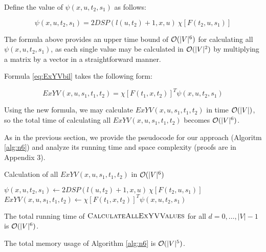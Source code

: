 Define the value of $\psi(x, u, t_2, s_1)$ as follows:

\begin{equation}
\psi(x, u, t_2, s_1) = 2DSP(l(u, t_2) + 1, x, u)~\chi[F(t_2, u, s_1)] \label{eq:psi}
\end{equation}

The formula above provides an upper time bound of $\mathcal{O}(|V|^6)$ for calculating all $\psi(x, u, t_2, s_1)$, as each single value may be calculated in $\mathcal{O}(|V|^2)$ by multiplying a matrix by a vector in a straightforward manner. 

Formula \eqref{eq:ExYVbil} takes the following form:

\begin{equation}
ExYV(x, u, s_1, t_1, t_2) = \chi[F(t_1, x, t_2)]^T \psi(x, u, t_2, s_1) \label{eq:ExYVpsi}
\end{equation}

Using the new formula, we may calculate $ExYV(x, u, s_1, t_1, t_2)$ in time $\mathcal{O}(|V|)$, so the total time of calculating all $ExYV(x, u, s_1, t_1, t_2)$ becomes $\mathcal{O}(|V|^6)$.

As in the previous section, we provide the pseudocode for our approach (Algoritm \ref{alg:n6}) and analyze its running time and space complexity (proofs are in Appendix 3).

\begin{algorithm}
\caption{Calculation of all $ExYV(x, u, s_1, t_1, t_2)$ in $\mathcal{O}(|V|^6)$} \label{alg:n6}
\begin{algorithmic}[1]
            \State $\psi(x, u, t_2, s_1) \gets 2DSP(l(u, t_2) + 1, x, u)~\chi[F(t_2, u, s_1)] \label{line:psi}$
        \EndFor
    \EndFor
                \State $ExYV(x, u, s_1, t_1, t_2) \gets \chi[F(t_1, x, t_2)]^T \psi(x, u, t_2, s_1)$ \label{line:ExYVpsi}
            \EndFor
        \EndFor
    \EndFor
\EndProcedure
\end{algorithmic}
\end{algorithm}

\begin{proposition}
The total running time of $\textsc{CalculateAllExYVValues}$ for all $d = 0, \ldots, |V|-1$ is $\mathcal{O}(|V|^6)$. 
\end{proposition}

\begin{proposition}
The total memory usage of Algorithm \ref{alg:n6} is $\mathcal{O}(|V|^5)$.
\end{proposition}

